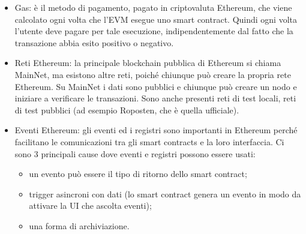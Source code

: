 \begin{itemize}
\item Gas: \`e il metodo di pagamento, pagato in criptovaluta Ethereum, che viene calcolato ogni volta che
l'EVM esegue uno smart contract. Quindi ogni volta l'utente deve pagare per tale esecuzione, indipendentemente dal fatto che la transazione abbia esito positivo o negativo.
\item Reti Ethereum: la principale blockchain pubblica di Ethereum si chiama MainNet, ma esistono altre reti, poich\'e chiunque pu\`o creare la propria rete Ethereum. Su MainNet i dati sono pubblici e chiunque pu\`o creare un nodo e iniziare a verificare le transazioni. Sono anche presenti reti di test locali, reti di test pubblici (ad esempio Roposten, che \`e quella ufficiale).
\item Eventi Ethereum: gli eventi ed i registri sono importanti in Ethereum perch\'e facilitano le comunicazioni tra gli smart contracts e la loro interfaccia.
Ci sono 3 principali cause dove eventi e registri possono essere usati:
\begin{itemize}
\item un evento pu\`o essere il tipo di ritorno dello smart contract;
\item trigger asincroni con dati (lo smart contract genera un evento in modo da attivare la UI che ascolta eventi);
\item una forma di archiviazione.
\end{itemize}


\end{itemize}
